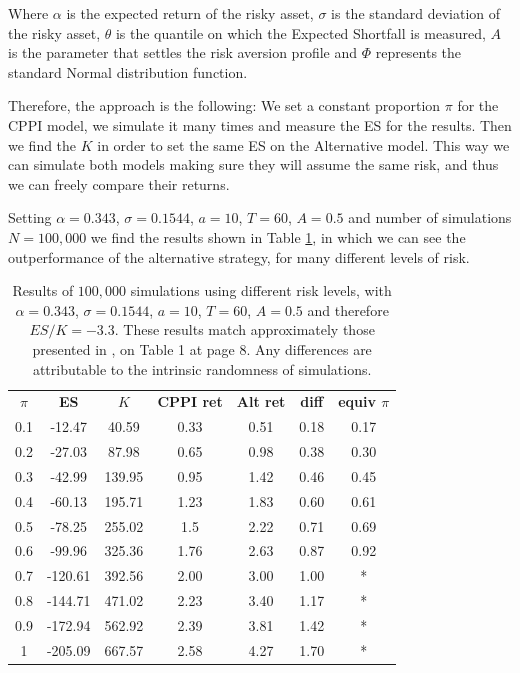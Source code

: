 Where $\alpha$ is the expected return of the risky asset, $\sigma$ is the standard deviation of the risky asset, $\theta$ is the quantile on which the Expected Shortfall is measured, $A$ is the parameter that settles the risk aversion profile and $\Phi$ represents the standard Normal distribution function.

Therefore, the approach is the following: We set a constant proportion $\pi$ for the CPPI model, we simulate it many times and measure the ES for the results. Then we find the $K$ in order to set the same ES on the Alternative model. This way we can simulate both models making sure they will assume the same risk, and thus we can freely compare their returns.

Setting $\alpha = 0.343$, $\sigma = 0.1544$, $a = 10$, $T = 60$, $A = 0.5$ and number of simulations $N = 100,000$ we find the results shown in Table \ref{tab:cppi_alt}, in which we can see the outperformance of the alternative strategy, for many different levels of risk.

\begin{table}[h]
\centering
\caption{Results of $100,000$ simulations using different risk levels, with $\alpha = 0.343$, $\sigma = 0.1544$, $a = 10$, $T = 60$, $A = 0.5$ and therefore $ES/K = -3.3$. These results match approximately those presented in \cite{a:guillen-optimisation}, on Table 1 at page 8. Any differences are attributable to the intrinsic randomness of simulations.}
\label{tab:cppi_alt}
\begin{tabular}{ccccccc}
\textbf{$\pi$} & \textbf{ES } & \textbf{$K$} & \textbf{CPPI ret} & \textbf{Alt ret} & \textbf{diff}  & \textbf{equiv $\pi$}\\
0.1   & -12.47  & 40.59  & 0.33     & 0.51    & 0.18    & 0.17\\
0.2   & -27.03  & 87.98  & 0.65     & 0.98    & 0.38    & 0.30 \\
0.3   & -42.99  & 139.95 & 0.95     & 1.42    & 0.46    & 0.45 \\
0.4   & -60.13  & 195.71 & 1.23     & 1.83    & 0.60    & 0.61 \\
0.5   & -78.25  & 255.02 & 1.5      & 2.22    & 0.71    & 0.69 \\
0.6   & -99.96  & 325.36 & 1.76     & 2.63    & 0.87    & 0.92 \\
0.7   & -120.61 & 392.56 & 2.00     & 3.00    & 1.00    & * \\
0.8   & -144.71 & 471.02 & 2.23     & 3.40    & 1.17    & * \\
0.9   & -172.94 & 562.92 & 2.39     & 3.81    & 1.42    & * \\
1     & -205.09 & 667.57 & 2.58     & 4.27    & 1.70    & *
\end{tabular}
\end{table}


